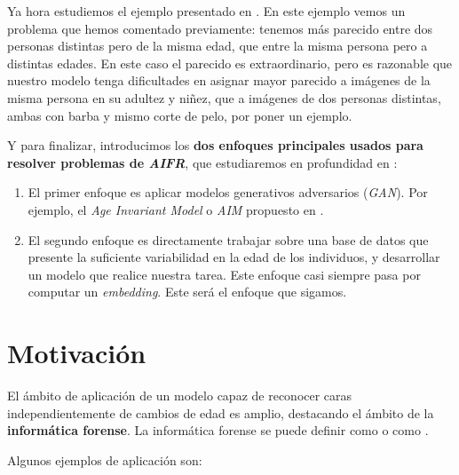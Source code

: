 Ya hora estudiemos el ejemplo presentado en . En este ejemplo vemos un problema que hemos comentado previamente: tenemos más parecido entre dos personas distintas pero de la misma edad, que entre la misma persona pero a distintas edades. En este caso el parecido es extraordinario, pero es razonable que nuestro modelo tenga dificultades en asignar mayor parecido a imágenes de la misma persona en su adultez y niñez, que a imágenes de dos personas distintas, ambas con barba y mismo corte de pelo, por poner un ejemplo.


Y para finalizar, introducimos los \textbf{dos enfoques principales usados para resolver problemas de \textit{AIFR}}, que estudiaremos en profundidad en :

\begin{enumerate}
    \item El primer enfoque es aplicar modelos generativos adversarios (\textit{GAN}). Por ejemplo, el \textit{Age Invariant Model} o \textit{AIM} propuesto en \cite{informatica:tecnica_sintesis_aifr}.
    \item El segundo enfoque es directamente trabajar sobre una base de datos que presente la suficiente variabilidad en la edad de los individuos, y desarrollar un modelo que realice nuestra tarea. Este enfoque casi siempre pasa por computar un \textit{embedding}. Este será el enfoque que sigamos.
\end{enumerate}

\section{Motivación}

El ámbito de aplicación de un modelo capaz de reconocer caras independientemente de cambios de edad es amplio, destacando el ámbito de la \textbf{informática forense}. La informática forense se puede definir como  o como  \cite{informatica:libro_informatica_forense}.

Algunos ejemplos de aplicación son:

